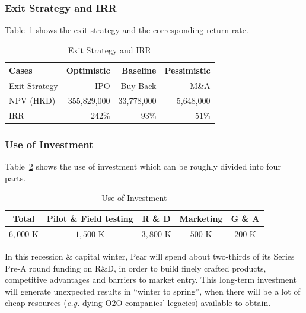 \subsubsection{Exit Strategy and IRR}
Table~\ref{tb:exit-strategy-irr} shows the exit strategy and the corresponding return rate. 
\begin{table}[htbp]
	\centering
	\caption{Exit Strategy and IRR}\label{tb:exit-strategy-irr}
	\begin{tabular}[t]{lrrr}  
		\toprule
		Cases & Optimistic & Baseline & Pessimistic\\
		\midrule
		Exit Strategy & IPO & Buy Back & M\&A\\
		NPV (HKD) & 355,829,000 & 33,778,000 & 5,648,000\\
		IRR & $242\%$ & $93\%$ & $51\%$\\
		\bottomrule
	\end{tabular}
\end{table}

\subsubsection{Use of Investment}
Table~\ref{tb:use-of-investment} shows the use of investment which can be roughly divided into four parts.  
\begin{table}[htbp]
	\centering
	\caption{Use of Investment}\label{tb:use-of-investment}
	\begin{tabular}[t]{ccccc}  
		\toprule
		Total & Pilot \& Field testing & R \& D & Marketing & G \& A\\
		\midrule
		$6,000$ K & $1,500$ K & $3,800$ K & $500$ K & $200$ K\\
		\bottomrule
	\end{tabular}
\end{table}

In this recession \& capital winter, Pear will spend about two-thirds of its Series Pre-A round funding on R\&D, in order to build finely crafted products, competitive advantages and barriers to market entry. 
This long-term investment will generate unexpected results in ``winter to spring'', when there will be a lot of cheap resources ({\em e.g.} dying O2O companies' legacies) available to obtain.

\newpage
